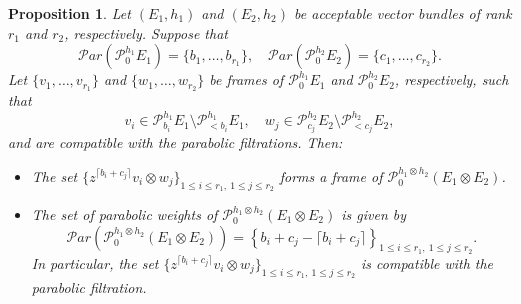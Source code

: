 \documentclass[12pt,twoside]{amsart}
\newtheorem{prop}[thm]{Proposition}
\theoremstyle{definition}
\begin{document}
\begin{prop}\label{p-prop16.1}
Let $(E_1, h_1)$ and $(E_2, h_2)$ be acceptable vector 
bundles of rank $r_1$ and $r_2$, respectively.  
Suppose that  
\[
\mathcal{P}ar(\mathcal{P}^{h_1}_{0}E_1) 
= \{b_1, \dots, b_{r_1}\}, \quad 
\mathcal{P}ar(\mathcal{P}^{h_2}_{0}E_2) = \{c_1, \dots, c_{r_2}\}.
\]  
Let $\{v_1, \ldots, v_{r_1}\}$ 
and $\{w_1, \ldots, w_{r_2}\}$ 
be frames of $\mathcal{P}^{h_1}_{0}E_1$ and $\mathcal{P}^{h_2}_{0}E_2$, respectively, such that  
\[
v_i \in \mathcal{P}^{h_1}_{b_i}E_1 
\setminus \mathcal{P}^{h_1}_{<b_i}E_1, \quad w_j 
\in \mathcal{P}^{h_2}_{c_j}E_2 \setminus \mathcal{P}^{h_2}_{<c_j}E_2,
\]  
and are compatible with the parabolic filtrations. Then:

\begin{itemize}
  \item[(i)] The set $\{z^{\lceil b_i + c_j \rceil} 
  v_i \otimes w_j\}_{1 \leq i \leq r_1,\ 1 \leq j \leq r_2}$ 
  forms a frame of $\mathcal{P}^{h_1 \otimes h_2}_{0}(E_1 \otimes E_2)$.
  
  \item[(ii)] The set of parabolic weights 
  of $\mathcal{P}^{h_1 \otimes h_2}_{0}(E_1 \otimes E_2)$ is given by  
  \[
  \mathcal{P}ar\left( \mathcal{P}^{h_1 \otimes h_2}_{0}(E_1 \otimes E_2) \right) 
  = \left\{ b_i + c_j - \lceil b_i + c_j \rceil 
  \right\}_{1 \leq i \leq r_1,\ 1 \leq j \leq r_2}.
  \]  
  In particular, the set $\{z^{\lceil b_i + c_j 
  \rceil} v_i \otimes w_j\}_{1 \leq i \leq r_1,\ 1 \leq j \leq r_2}$ 
  is compatible with the parabolic filtration.
\end{itemize}
\end{prop}
\end{document}
